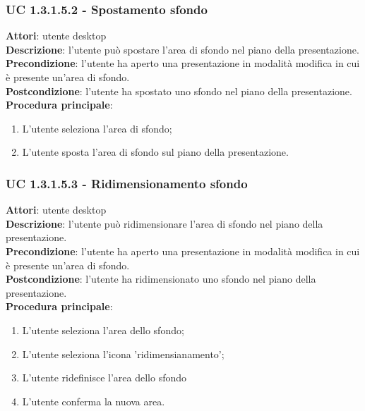 \subsubsection{UC 1.3.1.5.2 - Spostamento sfondo}{
	\label{uc1.3.1.5.2}
	\textbf{Attori}: utente desktop \\
	\textbf{Descrizione}: l'utente può spostare l'area di sfondo nel piano della presentazione. \\
	\textbf{Precondizione}: l'utente ha aperto una presentazione in modalità modifica in cui è presente un'area di sfondo.	\\
	\textbf{Postcondizione}: l'utente ha spostato uno sfondo nel piano della presentazione.	\\
	\textbf{Procedura principale}:
	\begin{enumerate}
		\item L'utente seleziona l'area di sfondo;
		\item L'utente sposta l'area di sfondo sul piano della presentazione.
	\end{enumerate}
}
\subsubsection{UC 1.3.1.5.3 - Ridimensionamento sfondo}{
	\label{uc1.3.1.5.3}
	\textbf{Attori}: utente desktop \\
	\textbf{Descrizione}: l'utente può ridimensionare l'area di sfondo nel piano della presentazione. \\
	\textbf{Precondizione}: l'utente ha aperto una presentazione in modalità modifica in cui è presente un'area di sfondo.	\\
	\textbf{Postcondizione}: l'utente ha ridimensionato uno sfondo nel piano della presentazione.	\\
	\textbf{Procedura principale}:
	\begin{enumerate}
		\item L'utente seleziona l'area dello sfondo;
		\item L'utente seleziona l'icona 'ridimensianamento';
		\item L'utente ridefinisce l'area dello sfondo
		\item L'utente conferma la nuova area.
	\end{enumerate}
}
